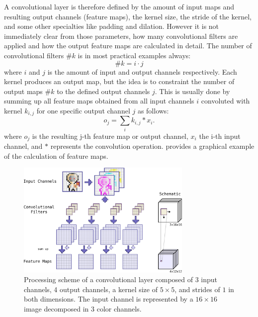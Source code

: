 A convolutional layer is therefore defined by the amount of input maps and resulting output channels (feature maps), the kernel size, the stride of the kernel, and some other specialties like padding and dilation.
However it is not immediately clear from those parameters, how many convolutional filters are applied and how the output feature maps are calculated in detail.
The number of convolutional filters $\#k$ is in most practical examples always:
\begin{equation}\label{eq:nn_theory_n_filters}
  \#k = i \cdot j
\end{equation}
where $i$ and $j$ is the amount of input and output channels respectively.
Each kernel produces an output map, but the idea is to constraint the number of output maps $\#k$ to the defined output channels $j$.
This is usually done by summing up all feature maps obtained from all input channels $i$ convoluted with kernel $k_{i, j}$ for one specific output channel $j$ as follows:
\begin{equation}
  o_j = \sum_{i} k_{i, j} \ast x_i.
\end{equation}
where $o_j$ is the resulting j-th feature map or output channel, $x_i$ the i-th input channel, and $\ast$ represents the convolution operation.
 provides a graphical example of the calculation of feature maps.
\begin{figure}[!ht]
  \centering
    \includegraphics[width=0.75\textwidth]{./4_nn/figs/nn_theory_cnn_basics.pdf}
  \caption{Processing scheme of a convolutional layer composed of 3 input channels, 4 output channels, a kernel size of $5 \times 5$, and strides of $1$ in both dimensions. The input channel is represented by a $16 \times 16$ image decomposed in 3 color channels.}
  \label{fig:nn_theory_cnn_basics}
\end{figure}
\FloatBarrier
\noindent

